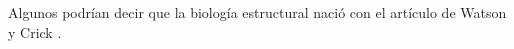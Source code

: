 \documentclass{article}
\begin{document}
Algunos podrían decir que la biología estructural nació con el artículo de Watson y Crick \cite{Watson1953}.
\printbibliography %
\end{document}

